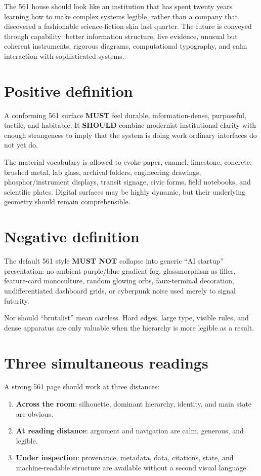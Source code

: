 \documentclass[11pt,twoside,openany]{report}
\newcommand{\MUST}{\textbf{MUST}\xspace}
\newcommand{\MUSTNOT}{\textbf{MUST NOT}\xspace}
\newcommand{\SHOULD}{\textbf{SHOULD}\xspace}
\begin{document}
\vspace{1em}

The 561 house should look like an institution that has spent twenty years learning how to make complex systems legible, rather than a company that discovered a fashionable science-fiction skin last quarter. The future is conveyed through capability: better information structure, live evidence, unusual but coherent instruments, rigorous diagrams, computational typography, and calm interaction with sophisticated systems.

\section{Positive definition}
\begin{specbox}
A conforming 561 surface \MUST feel durable, information-dense, purposeful, tactile, and habitable. It \SHOULD combine modernist institutional clarity with enough strangeness to imply that the system is doing work ordinary interfaces do not yet do.
\end{specbox}

The material vocabulary is allowed to evoke paper, enamel, limestone, concrete, brushed metal, lab glass, archival folders, engineering drawings, phosphor/instrument displays, transit signage, civic forms, field notebooks, and scientific plates. Digital surfaces may be highly dynamic, but their underlying geometry should remain comprehensible.

\section{Negative definition}
\begin{alarmbox}
The default 561 style \MUSTNOT collapse into generic ``AI startup'' presentation: no ambient purple/blue gradient fog, glassmorphism as filler, feature-card monoculture, random glowing orbs, faux-terminal decoration, undifferentiated dashboard grids, or cyberpunk noise used merely to signal futurity.
\end{alarmbox}

Nor should ``brutalist'' mean careless. Hard edges, large type, visible rules, and dense apparatus are only valuable when the hierarchy is more legible as a result.

\section{Three simultaneous readings}
A strong 561 page should work at three distances:
\begin{enumerate}
  \item \textbf{Across the room}: silhouette, dominant hierarchy, identity, and main state are obvious.
  \item \textbf{At reading distance}: argument and navigation are calm, generous, and legible.
  \item \textbf{Under inspection}: provenance, metadata, data, citations, state, and machine-readable structure are available without a second visual language.
\end{enumerate}
\end{document}
